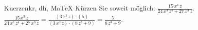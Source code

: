 \begin{MAufgabe}{Kuerzen}{kr, dh, MaTeX}
K\"urzen Sie soweit m\"oglich: $\frac{15\, x^3\, z}{24\, x^3\, z^4 + 27\, x^3\, z}$.\\ 
\ifLsg\MLoesung
\quad $\frac{15\, x^3\, z}{24\, x^3\, z^4 + 27\, x^3\, z}=\frac{(3\, x^3\, z)\cdot(5)}{(3\, x^3\, z)\cdot(8\, z^3 + 9)}=\frac{5}{8\, z^3 + 9}$.\else\relax\fi
 \end{MAufgabe}